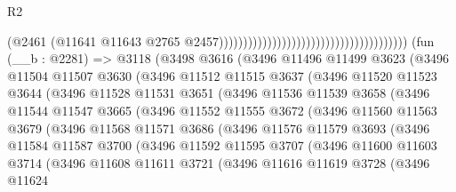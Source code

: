 \begin{lexlean}{R2}
\begin{coremodule}
                                                                              (@2461
                                                                                (@11641
                                                                                  @11643
                                                                                  @2765
                                                                                  @2457)))))))))))))))))))))))))))))))))))))))
    (fun (__b : @2281) =>
    @3118
      (@3498
        @3616
        (@3496
          @11496
          @11499
          @3623
          (@3496
            @11504
            @11507
            @3630
            (@3496
              @11512
              @11515
              @3637
              (@3496
                @11520
                @11523
                @3644
                (@3496
                  @11528
                  @11531
                  @3651
                  (@3496
                    @11536
                    @11539
                    @3658
                    (@3496
                      @11544
                      @11547
                      @3665
                      (@3496
                        @11552
                        @11555
                        @3672
                        (@3496
                          @11560
                          @11563
                          @3679
                          (@3496
                            @11568
                            @11571
                            @3686
                            (@3496
                              @11576
                              @11579
                              @3693
                              (@3496
                                @11584
                                @11587
                                @3700
                                (@3496
                                  @11592
                                  @11595
                                  @3707
                                  (@3496
                                    @11600
                                    @11603
                                    @3714
                                    (@3496
                                      @11608
                                      @11611
                                      @3721
                                      (@3496
                                        @11616
                                        @11619
                                        @3728
                                        (@3496
                                          @11624

\end{coremodule}
\end{lexlean}
